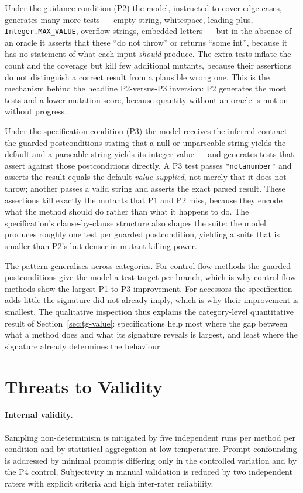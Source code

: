 Under the guidance condition (P2) the model, instructed to cover edge cases,
generates many more tests --- empty string, whitespace, leading-plus,
\texttt{Integer.MAX\_VALUE}, overflow strings, embedded letters --- but in the
absence of an oracle it asserts that these ``do not throw'' or returns
``some int'', because it has no statement of what each input \emph{should}
produce. The extra tests inflate the count and the coverage but kill few
additional mutants, because their assertions do not distinguish a correct result
from a plausible wrong one. This is the mechanism behind the headline P2-versus-P3
inversion: P2 generates the most tests and a lower mutation score, because
quantity without an oracle is motion without progress.

Under the specification condition (P3) the model receives the inferred contract
--- the guarded postconditions stating that a null or unparseable string yields
the default and a parseable string yields its integer value --- and generates
tests that assert against those postconditions directly. A P3 test passes
\texttt{"notanumber"} and asserts the result equals the default \emph{value
supplied}, not merely that it does not throw; another passes a valid string and
asserts the exact parsed result. These assertions kill exactly the mutants that
P1 and P2 miss, because they encode what the method should do rather than what it
happens to do. The specification's clause-by-clause structure also shapes the
suite: the model produces roughly one test per guarded postcondition, yielding a
suite that is smaller than P2's but denser in mutant-killing power.

The pattern generalises across categories. For control-flow methods the
guarded postconditions give the model a test target per branch, which is why
control-flow methods show the largest P1-to-P3 improvement. For accessors the
specification adds little the signature did not already imply, which is why their
improvement is smallest. The qualitative inspection thus explains the
category-level quantitative result of Section~\ref{sec:tg-value}: specifications
help most where the gap between what a method does and what its signature reveals
is largest, and least where the signature already determines the behaviour.

\section{Threats to Validity}
\label{sec:tg-threats}

\paragraph{Internal validity.} Sampling non-determinism is mitigated by five
independent runs per method per condition and by statistical aggregation at low
temperature. Prompt confounding is addressed by minimal prompts differing only
in the controlled variation and by the P4 control. Subjectivity in manual
validation is reduced by two independent raters with explicit criteria and high
inter-rater reliability.

